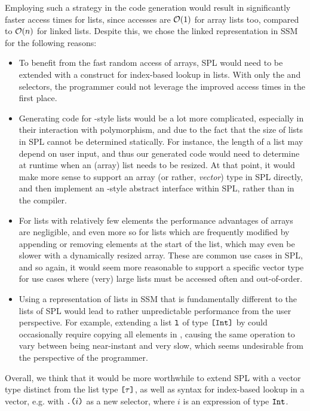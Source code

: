 Employing such a strategy in the code generation would result in significantly
faster access times for lists, since accesses are $\mathcal{O}(1)$ for array lists
too, compared to $\mathcal{O}(n)$ for linked lists.
Despite this, we chose the linked representation in SSM for the following reasons:
%
\begin{itemize}
  \item To benefit from the fast random access of arrays, SPL would need to be
        extended with a construct for index-based lookup in lists. With only the
         and  selectors, the programmer could not leverage the
        improved access times in the first place.
  \item Generating code for -style lists would be a lot more
        complicated, especially in their interaction with polymorphism, and due
        to the fact that the size of lists in SPL cannot be determined
        statically. For instance, the length of a list may depend on user input,
        and thus our generated code would need to determine at runtime when an
        (array) list needs to be resized. At that point, it would make more
        sense to support an array (or rather, \emph{vector}) type in SPL
        directly, and then implement an -style abstract
        interface within SPL, rather than in the compiler.
  \item For lists with relatively few elements the performance advantages of
        arrays are negligible, and even more so for lists which are frequently
        modified by appending or removing elements at the start of the list,
        which may even be slower with a dynamically resized array.
        These are common use cases in SPL, and so again, it would seem more
        reasonable to support a specific vector type for use cases where (very)
        large lists must be accessed often and out-of-order.
  \item Using a representation of lists in SSM that is fundamentally different
        to the lists of SPL would lead to rather unpredictable performance from
        the user perspective. For example, extending a list
        $\texttt{l}$ of type $\texttt{[}\texttt{Int}\texttt{]}$ by  could occasionally
        require copying all elements in , causing the same operation to
        vary between being near-instant and very slow, which seems undesirable
        from the perspective of the programmer.
\end{itemize}

Overall, we think that it would be more worthwhile to extend SPL with a vector
type distinct from the list type $\texttt{[}\tau\texttt{]}$, as well as syntax for
index-based lookup in a vector, e.g. with $\texttt{.(}i\texttt{)}$ as a new
selector, where $i$ is an expression of type $\texttt{Int}$.


